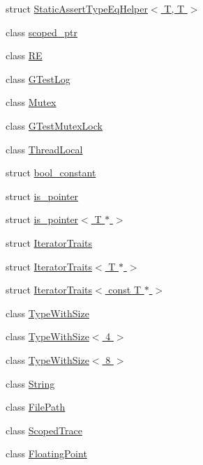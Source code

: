 \begin{DoxyCompactItemize}
\item 
struct \hyperlink{structtesting_1_1internal_1_1_static_assert_type_eq_helper_3_01_t_00_01_t_01_4}{Static\-Assert\-Type\-Eq\-Helper$<$ T, T $>$}
\item 
class \hyperlink{classtesting_1_1internal_1_1scoped__ptr}{scoped\-\_\-ptr}
\item 
class \hyperlink{classtesting_1_1internal_1_1_r_e}{R\-E}
\item 
class \hyperlink{classtesting_1_1internal_1_1_g_test_log}{G\-Test\-Log}
\item 
class \hyperlink{classtesting_1_1internal_1_1_mutex}{Mutex}
\item 
class \hyperlink{classtesting_1_1internal_1_1_g_test_mutex_lock}{G\-Test\-Mutex\-Lock}
\item 
class \hyperlink{classtesting_1_1internal_1_1_thread_local}{Thread\-Local}
\item 
struct \hyperlink{structtesting_1_1internal_1_1bool__constant}{bool\-\_\-constant}
\item 
struct \hyperlink{structtesting_1_1internal_1_1is__pointer}{is\-\_\-pointer}
\item 
struct \hyperlink{structtesting_1_1internal_1_1is__pointer_3_01_t_01_5_01_4}{is\-\_\-pointer$<$ T $\ast$ $>$}
\item 
struct \hyperlink{structtesting_1_1internal_1_1_iterator_traits}{Iterator\-Traits}
\item 
struct \hyperlink{structtesting_1_1internal_1_1_iterator_traits_3_01_t_01_5_01_4}{Iterator\-Traits$<$ T $\ast$ $>$}
\item 
struct \hyperlink{structtesting_1_1internal_1_1_iterator_traits_3_01const_01_t_01_5_01_4}{Iterator\-Traits$<$ const T $\ast$ $>$}
\item 
class \hyperlink{classtesting_1_1internal_1_1_type_with_size}{Type\-With\-Size}
\item 
class \hyperlink{classtesting_1_1internal_1_1_type_with_size_3_014_01_4}{Type\-With\-Size$<$ 4 $>$}
\item 
class \hyperlink{classtesting_1_1internal_1_1_type_with_size_3_018_01_4}{Type\-With\-Size$<$ 8 $>$}
\item 
class \hyperlink{classtesting_1_1internal_1_1_string}{String}
\item 
class \hyperlink{classtesting_1_1internal_1_1_file_path}{File\-Path}
\item 
class \hyperlink{classtesting_1_1internal_1_1_scoped_trace}{Scoped\-Trace}
\item 
class \hyperlink{classtesting_1_1internal_1_1_floating_point}{Floating\-Point}

\end{DoxyCompactItemize}
